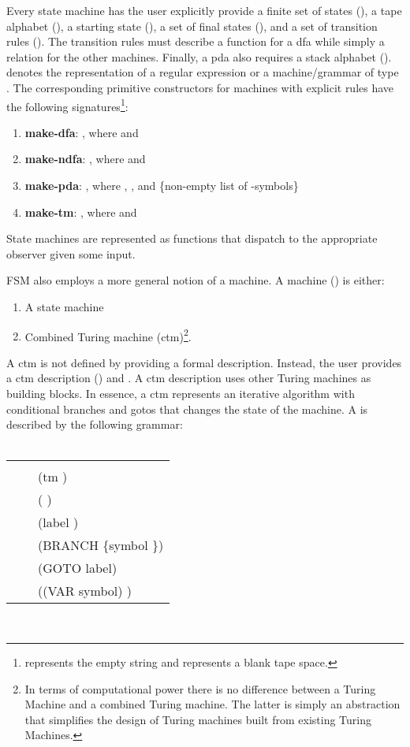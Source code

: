\documentclass{eptcs}
\begin{document}
Every state machine has the user explicitly provide a finite set of states (), a tape alphabet (), a starting state (), a set of final states (), and a set of transition rules (). The transition rules must describe a function for a \textsf{dfa} while simply a relation for the other machines. Finally, a \textsf{pda} also requires a stack alphabet ().  denotes the representation of a regular expression or a machine/grammar of type . The corresponding primitive constructors for machines with explicit rules have the following signatures\footnote{ represents the empty string and  represents a blank tape space.}:
\begin{enumerate}
   \item \textbf{make-dfa}:       , \newline  where  and 
   \item \textbf{make-ndfa}:       , \newline  where  and 
   \item \textbf{make-pda}:        , \newline  where , , and \newline   \{non-empty list of -symbols\} 
   \item \textbf{make-tm}:       , \newline  where  and 
\end{enumerate}
State machines are represented as functions that dispatch to the appropriate observer given some input.

\textsf{FSM} also employs a more general notion of a machine. A machine () is either:
 \begin{enumerate}
   \item A state machine
   \item Combined Turing machine (\textsf{ctm})\footnote{In terms of computational power there is no difference between a Turing Machine and a combined Turing machine. The latter is simply an abstraction that simplifies the design of Turing machines built from existing Turing Machines.}.
 \end{enumerate}
A \textsf{ctm} is not defined by providing a formal description. Instead, the user provides a \textsf{ctm} description () and . A \textsf{ctm} description uses other Turing machines as building blocks. In essence, a \textsf{ctm} represents an iterative algorithm with conditional branches and gotos that changes the state of the machine.  A  is described by the following grammar:\\ \\
\begin{centering}
\begin{tabular}{rcl}
 &  &  \\
   &  & (\textsf{tm} ) \\
   &  & ( ) \\
   &  &  (\textsf{label} ) \\
   &  & (\textsf{BRANCH} \{\textsf{symbol} \}) \\
   &  & (\textsf{GOTO} \textsf{label}) \\
   &  & ((\textsf{VAR} symbol) ) \\
\end{tabular}
\end{centering}\\
\end{document}
